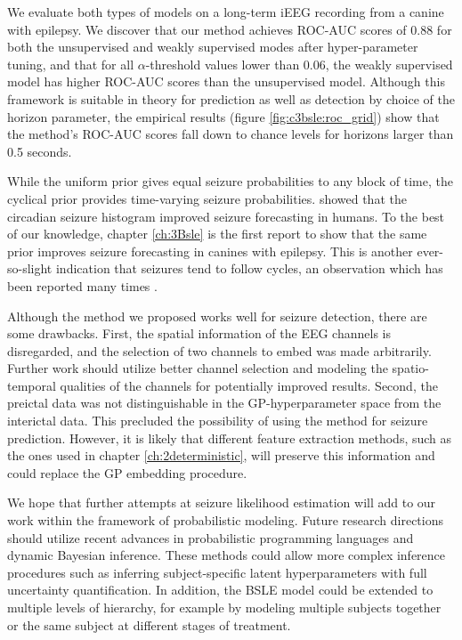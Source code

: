 We evaluate both types of models on a long-term iEEG recording from a canine with epilepsy. We discover that our method achieves ROC-AUC scores of 0.88 for both the unsupervised and weakly supervised modes after hyper-parameter tuning, and that for all $\alpha$-threshold values lower than 0.06, the weakly supervised model has higher ROC-AUC scores than the unsupervised model. Although this framework is suitable in theory for prediction as well as detection by choice of the horizon parameter, the empirical results (figure \ref{fig:c3bsle:roc_grid}) show that the method's ROC-AUC scores fall down to chance levels for horizons larger than 0.5 seconds.


While the uniform prior gives equal seizure probabilities to any block of time, the cyclical prior provides time-varying seizure probabilities. \citet{karoly2017circadian} showed that the circadian seizure histogram improved seizure forecasting in humans. To the best of our knowledge, chapter \ref{ch:3Bsle} is the first report to show that the same prior improves seizure forecasting in canines with epilepsy. This is another ever-so-slight indication that seizures tend to follow cycles, an observation which has been reported many times \cite{karoly2021cycles}.

Although the method we proposed works well for seizure detection, there are some drawbacks. First, the spatial information of the EEG channels is disregarded, and the selection of two channels to embed was made arbitrarily. Further work should utilize better channel selection and modeling the spatio-temporal qualities of the channels for potentially improved results. Second, the preictal data was not distinguishable in the GP-hyperparameter space from the interictal data. This precluded the possibility of using the method for seizure prediction. However, it is likely that different feature extraction methods, such as the ones used in chapter \ref{ch:2deterministic}, will preserve this information and could replace the GP embedding procedure.

We hope that further attempts at seizure likelihood estimation will add to our work within the framework of probabilistic modeling. Future research directions should utilize recent advances in probabilistic programming languages and dynamic Bayesian inference. These methods could allow more complex inference procedures such as inferring subject-specific latent hyperparameters with full uncertainty quantification. In addition, the BSLE model could be extended to multiple levels of hierarchy, for example by modeling multiple subjects together or the same subject at different stages of treatment.

